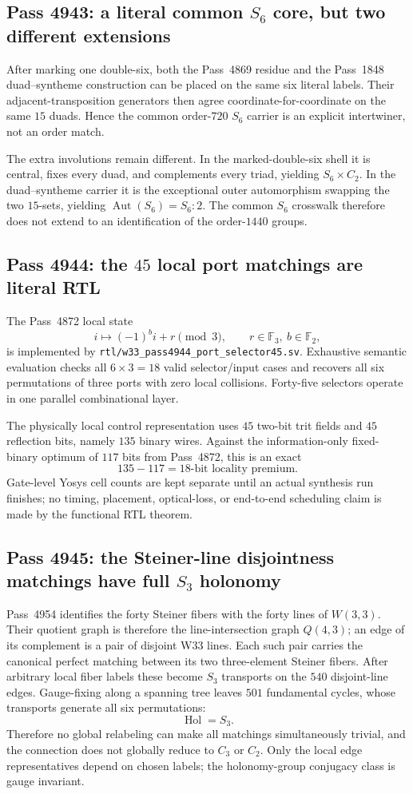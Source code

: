 \subsection{Pass 4943: a literal common $S_6$ core, but two different extensions}
After marking one double-six, both the Pass~4869 residue and the Pass~1848
duad--syntheme construction can be placed on the same six literal labels.
Their adjacent-transposition generators then agree coordinate-for-coordinate
on the same $15$ duads.  Hence the common order-$720$ $S_6$ carrier is an
explicit intertwiner, not an order match.

The extra involutions remain different.  In the marked-double-six shell it is
central, fixes every duad, and complements every triad, yielding
$S_6\times C_2$.  In the duad--syntheme carrier it is the exceptional outer
automorphism swapping the two $15$-sets, yielding
$\operatorname{Aut}(S_6)=S_6{:}2$.  The common $S_6$ crosswalk therefore does
not extend to an identification of the order-$1440$ groups.

\subsection{Pass 4944: the $45$ local port matchings are literal RTL}
The Pass~4872 local state
\[
  i\longmapsto(-1)^b i+r\pmod3,
  \qquad r\in\mathbb F_3,\ b\in\mathbb F_2,
\]
is implemented by \texttt{rtl/w33\_pass4944\_port\_selector45.sv}.  Exhaustive
semantic evaluation checks all $6\times3=18$ valid selector/input cases and
recovers all six permutations of three ports with zero local collisions.
Forty-five selectors operate in one parallel combinational layer.

The physically local control representation uses $45$ two-bit trit fields and
$45$ reflection bits, namely $135$ binary wires.  Against the information-only
fixed-binary optimum of $117$ bits from Pass~4872, this is an exact
\[
  \boxed{135-117=18\text{-bit locality premium}.}
\]
Gate-level Yosys cell counts are kept separate until an actual synthesis run
finishes; no timing, placement, optical-loss, or end-to-end scheduling claim is
made by the functional RTL theorem.

\subsection{Pass 4945: the Steiner-line disjointness matchings have full $S_3$ holonomy}
Pass~4954 identifies the forty Steiner fibers with the forty lines of
$W(3,3)$.  Their quotient graph is therefore the line-intersection graph
$Q(4,3)$; an edge of its complement is a pair of disjoint W33 lines.  Each
such pair carries the canonical perfect matching between its two
three-element Steiner fibers.  After arbitrary local fiber labels these become
$S_3$ transports on the $540$ disjoint-line edges.  Gauge-fixing along a
spanning tree leaves $501$ fundamental cycles, whose transports generate all
six permutations:
\[
  \boxed{\operatorname{Hol}=S_3.}
\]
Therefore no global relabeling can make all matchings simultaneously trivial,
and the connection does not globally reduce to $C_3$ or $C_2$.  Only the local
edge representatives depend on chosen labels; the holonomy-group conjugacy
class is gauge invariant.

